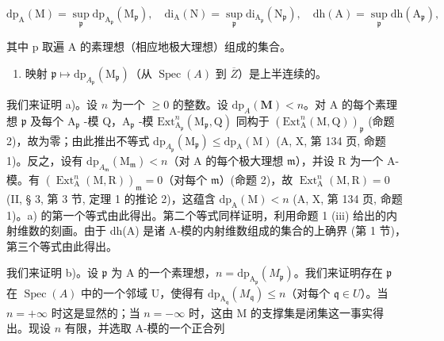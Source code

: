 \[
\mathrm{dp} _ {\mathrm{A}} (\mathrm{M}) = \sup _ {\mathfrak {p}} \mathrm{dp} _ {\mathrm{A} _ {\mathfrak {p}}} \left(\mathrm{M} _ {\mathfrak {p}}\right), \quad \mathrm{di} _ {\mathrm{A}} (\mathrm{N}) = \sup _ {\mathfrak {p}} \mathrm{di} _ {\mathrm{A} _ {\mathfrak {p}}} \left(\mathrm{N} _ {\mathfrak {p}}\right), \quad \mathrm{dh} (\mathrm{A}) = \sup _ {\mathfrak {p}} \mathrm{dh} \left(\mathrm{A} _ {\mathfrak {p}}\right),
\]

其中 p 取遍 A 的素理想（相应地极大理想）组成的集合。

\begin{enumerate}
\def\labelenumi{\alph{enumi})}
\setcounter{enumi}{1}
\tightlist
\item
  映射 \(\mathfrak{p} \mapsto \mathrm{dp}_{A_{\mathfrak{p}}}(\mathrm{M}_{\mathfrak{p}})\)（从 \(\operatorname{Spec}(A)\) 到 \(\overline{Z}\)）是上半连续的。
\end{enumerate}

我们来证明 a)。设 \(n\) 为一个 \(\geqslant 0\) 的整数。设 \(\mathrm{dp}_{A}(\mathbf{M}) < n\)。对 A 的每个素理想 \(\mathfrak{p}\) 及每个 \(\mathrm{A}_{\mathfrak{p}}\) -模 Q，\(\mathrm{A}_{\mathfrak{p}}\) -模 \(\mathrm{Ext}_{\mathrm{A}_{\mathfrak{p}}}^{n}(\mathrm{M}_{\mathfrak{p}},\mathrm{Q})\) 同构于 \((\mathrm{Ext}_{\mathrm{A}}^{n}(\mathrm{M},\mathrm{Q}))_{\mathfrak{p}}\) (命题 2)，故为零；由此推出不等式 \(\mathrm{dp}_{A_{\mathfrak{p}}}(\mathrm{M}_{\mathfrak{p}}) \leqslant \mathrm{dp}_{\mathrm{A}}(\mathrm{M})\) (A, X, 第 134 页, 命题 1)。反之，设有 \(\mathrm{dp}_{A_{\mathfrak{m}}}(\mathrm{M}_{\mathfrak{m}}) < n\)（对 A 的每个极大理想 \(\mathfrak{m}\)），并设 R 为一个 A-模。有 \((\operatorname{Ext}_{\mathrm{A}}^{n}(\mathrm{M}, \mathrm{R}))_{\mathfrak{m}} = 0\)（对每个 \(\mathfrak{m}\)）(命题 2)，故 \(\operatorname{Ext}_{\mathrm{A}}^{n}(\mathrm{M}, \mathrm{R}) = 0\) (II, § 3, 第 3 节, 定理 1 的推论 2)，这蕴含 \(\mathrm{dp}_{\mathrm{A}}(\mathrm{M}) < n\) (A, X, 第 134 页, 命题 1)。a) 的第一个等式由此得出。第二个等式同样证明，利用命题 1 (iii) 给出的内射维数的刻画。由于 dh(A) 是诸 A-模的内射维数组成的集合的上确界 (第 1 节)，第三个等式由此得出。

我们来证明 b)。设 \(\mathfrak{p}\) 为 A 的一个素理想，\(n = \mathrm{dp}_{\mathrm{A}_{\mathfrak{p}}}(M_{\mathfrak{p}})\)。我们来证明存在 \(\mathfrak{p}\) 在 \(\operatorname{Spec}(A)\) 中的一个邻域 U，使得有 \(\mathrm{dp}_{\mathrm{A}_{\mathfrak{q}}}(M_{\mathfrak{q}}) \leqslant n\)（对每个 \(\mathfrak{q} \in U\)）。当 \(n = +\infty\) 时这是显然的；当 \(n = -\infty\) 时，这由 M 的支撑集是闭集这一事实得出。现设 \(n\) 有限，并选取 A-模的一个正合列

